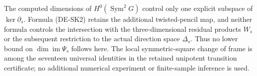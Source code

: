 \begin{remark}
\label{rem:DE-A3-symmetric-boundary-kernel-scope-candidate}
The computed dimensions of $H^0(\operatorname{Sym}^2G)$ control only
one explicit subspace of $\ker\partial_s$. Formula (DE-SK2) retains
the additional twisted-pencil map, and neither formula controls the
intersection with the three-dimensional residual products $W_s$ or
the subsequent restriction to the actual direction space $\Delta_s$.
Thus no lower bound on $\dim\operatorname{im}\Psi_s$ follows here.
The local symmetric-square change of frame is among the seventeen
universal identities in the retained unipotent transition certificate;
no additional numerical experiment or finite-sample inference is used.
\end{remark}
